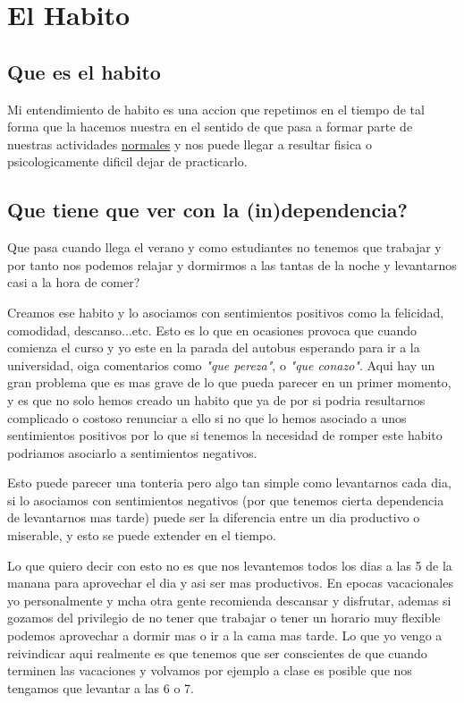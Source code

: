 \chapter{El Habito}
\section{ Que es el habito }
Mi entendimiento de habito es una accion que repetimos en el tiempo \cite{lally2010habits} de tal forma que la hacemos nuestra en el sentido de que pasa a formar parte de nuestras actividades \underline{normales} y nos puede llegar a resultar fisica o psicologicamente dificil dejar de practicarlo. 
\section{ Que tiene que ver con la (in)dependencia?}
Que pasa cuando llega el verano y como estudiantes no tenemos que trabajar y por tanto nos podemos relajar y dormirmos a las tantas de la noche y levantarnos casi a la hora de comer?

Creamos ese habito y lo asociamos con sentimientos positivos como la felicidad, comodidad, descanso...etc. Esto es lo que en ocasiones provoca que cuando comienza el curso y yo este en la parada del autobus esperando para ir a la universidad, oiga comentarios como \textit{"que pereza"}, o \textit{"que conazo"}. Aqui hay un gran problema que es mas grave de lo que pueda parecer en un primer momento, y es que no solo hemos creado un habito que ya de por si podria resultarnos complicado o costoso renunciar a ello si no que lo hemos asociado a unos sentimientos positivos por lo que si tenemos la necesidad de romper este habito podriamos asociarlo a sentimientos negativos. 

Esto puede parecer una tonteria pero algo tan simple como levantarnos cada dia, si lo asociamos con sentimientos negativos (por que tenemos cierta dependencia de levantarnos mas tarde) puede ser la diferencia entre un dia productivo o miserable, y esto se puede extender en el tiempo.

Lo que quiero decir con esto no es que nos levantemos todos los dias a las 5 de la manana para aprovechar el dia y asi ser mas productivos. En epocas vacacionales yo personalmente y mcha otra gente recomienda descansar y disfrutar, ademas si gozamos del privilegio de no tener que trabajar o tener un horario muy flexible podemos aprovechar a dormir mas o ir a la cama mas tarde. Lo que yo vengo a reivindicar aqui realmente es que tenemos que ser conscientes de que cuando terminen las vacaciones y volvamos por ejemplo a clase es posible que nos tengamos que levantar a las 6 o 7.

